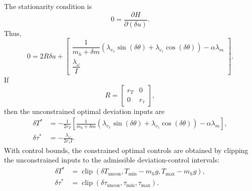 The stationarity condition is
\begin{equation}
    0 = \frac{\partial H}{\partial (\delta u)}.
\end{equation}
Thus,
\begin{equation}
    0
    =
    2R\delta u
    +
    \begin{bmatrix}
        \dfrac{1}{m_h+\delta m}
        \left(
            \lambda_{v_x}\sin(\delta\theta)
            +
            \lambda_{v_z}\cos(\delta\theta)
        \right)
        -
        \alpha\lambda_m
        \\[6pt]
        \dfrac{\lambda_{\omega}}{I}
    \end{bmatrix}.
\end{equation}
If
\begin{equation}
    R
    =
    \begin{bmatrix}
        r_T & 0 \\
        0 & r_{\tau}
    \end{bmatrix},
\end{equation}
then the unconstrained optimal deviation inputs are
\begin{align}
    \delta T^*
    &=
    -\frac{1}{2r_T}
    \left[
        \frac{1}{m_h+\delta m}
        \left(
            \lambda_{v_x}\sin(\delta\theta)
            +
            \lambda_{v_z}\cos(\delta\theta)
        \right)
        -
        \alpha\lambda_m
    \right], \\
    \delta\tau^*
    &=
    -\frac{\lambda_{\omega}}{2r_{\tau}I}.
\end{align}
With control bounds, the constrained optimal controls are obtained by clipping the unconstrained inputs to the admissible deviation-control intervals:
\begin{align}
    \delta T^*
    &=
    \operatorname{clip}
    \left(
        \delta T_{\mathrm{uncon}},
        T_{\min}-m_hg,
        T_{\max}-m_hg
    \right), \\
    \delta\tau^*
    &=
    \operatorname{clip}
    \left(
        \delta\tau_{\mathrm{uncon}},
        \tau_{\min},
        \tau_{\max}
    \right).
\end{align}


